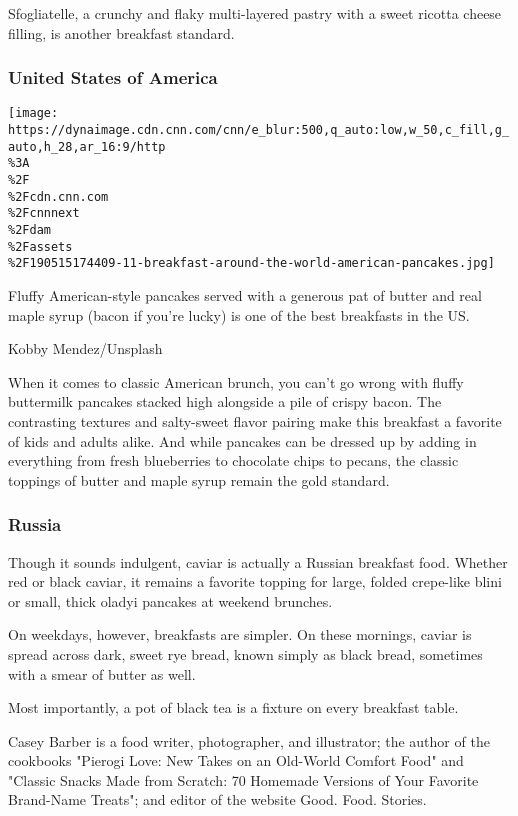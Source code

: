 Sfogliatelle, a crunchy and flaky multi-layered pastry with a sweet
ricotta cheese filling, is another breakfast standard.

\hypertarget{united-states-of-america}{%
\subsubsection{United States of
America}\label{united-states-of-america}}

\href{/travel/article/breakfast-food-around-the-world/index.html?gallery=19}{}

\texttt{[image: https://dynaimage.cdn.cnn.com/cnn/e\_blur:500,q\_auto:low,w\_50,c\_fill,g\_auto,h\_28,ar\_16:9/http\\\%3A\\\%2F\\\%2Fcdn.cnn.com\\\%2Fcnnnext\\\%2Fdam\\\%2Fassets\\\%2F190515174409-11-breakfast-around-the-world-american-pancakes.jpg]}

Fluffy American-style pancakes served with a generous pat of butter and
real maple syrup (bacon if you're lucky) is one of the best breakfasts
in the US.

Kobby Mendez/Unsplash

When it comes to classic American brunch, you can't go wrong with fluffy
buttermilk pancakes stacked high alongside a pile of crispy bacon. The
contrasting textures and salty-sweet flavor pairing make this breakfast
a favorite of kids and adults alike. And while pancakes can be dressed
up by adding in everything from fresh blueberries to chocolate chips to
pecans, the classic toppings of butter and maple syrup remain the gold
standard.

\hypertarget{russia}{%
\subsubsection{Russia}\label{russia}}

Though it sounds indulgent, caviar is actually a Russian breakfast food.
Whether red or black caviar, it remains a favorite topping for large,
folded crepe-like blini or small, thick oladyi pancakes at weekend
brunches.

On weekdays, however, breakfasts are simpler. On these mornings, caviar
is spread across dark, sweet rye bread, known simply as black bread,
sometimes with a smear of butter as well.

Most importantly, a pot of black tea is a fixture on every breakfast
table.

Casey Barber is a food writer, photographer, and illustrator; the author
of the cookbooks "Pierogi Love: New Takes on an Old-World Comfort Food"
and "Classic Snacks Made from Scratch: 70 Homemade Versions of Your
Favorite Brand-Name Treats"; and editor of the website Good. Food.
Stories.

